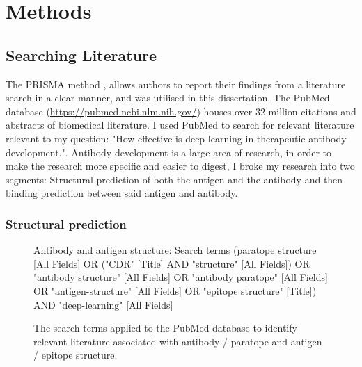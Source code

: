 \chapter{Methods}
\section{Searching Literature}

The PRISMA method \cite{pagePRISMA2020Statement2021}, allows authors to report their findings from a literature search in a clear manner, and was utilised in this dissertation. The PubMed database (\url{https://pubmed.ncbi.nlm.nih.gov/}) houses over 32 million citations and abstracts of biomedical literature. I used PubMed to search for relevant literature relevant to my question: "How effective is deep learning in therapeutic antibody development.". Antibody development is a large area of research, in order to make the research more specific and easier to digest, I broke my research into two segments: Structural prediction of both the antigen and the antibody and then binding prediction between said antigen and antibody.



\subsection{Structural prediction}

\begin{figure}[h!]
    \begin{redbox}{Antibody and antigen structure: Search terms}
        (paratope structure [All Fields] OR ("CDR" [Title] AND "structure" [All Fields]) OR "antibody structure" [All Fields] OR "antibody paratope" [All Fields] OR "antigen-structure" [All Fields] OR "epitope structure" [Title]) AND "deep-learning" [All Fields] 
    \end{redbox}
    \caption{The search terms applied to the PubMed database to identify relevant literature associated with antibody / paratope and antigen / epitope structure.}
    \label{box:antibody_antigen_search}

\end{figure}

